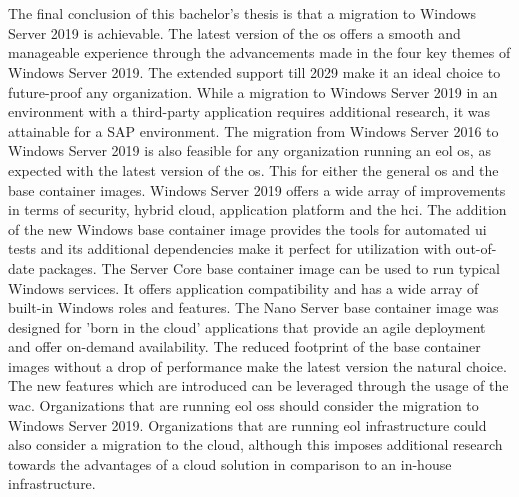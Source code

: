 \chapter{}
\label{ch:conclusie}
The final conclusion of this bachelor's thesis is that a migration to Windows Server 2019 is achievable.
The latest version of the \acrshort{os} offers a smooth and manageable experience through the advancements made in the four key themes of Windows Server 2019. 
The extended support till 2029 make it an ideal choice to future-proof any organization. 
While a migration to Windows Server 2019 in an environment with a third-party application requires additional research, it was attainable for a SAP environment. 
The migration from Windows Server 2016 to Windows Server 2019 is also feasible for any organization running an \acrshort{eol} \acrshort{os}, as expected with the latest version of the \acrshort{os}.
This for either the general \acrshort{os} and the base container images.
Windows Server 2019 offers a wide array of improvements in terms of security, hybrid cloud, application platform and the \acrfull{hci}.
The addition of the new Windows base container image provides the tools for automated \acrshort{ui} tests and its additional dependencies make it perfect for utilization with out-of-date packages. 
The Server Core base container image can be used to run typical Windows services. 
It offers application compatibility and has a wide array of built-in Windows roles and features. 
The Nano Server base container image was designed for 'born in the cloud' applications that provide an agile deployment and offer on-demand availability. 
The reduced footprint of the base container images without a drop of performance make the latest version the natural choice. 
The new features which are introduced can be leveraged through the usage of the \acrfull{wac}.
Organizations that are running \acrshort{eol} \acrlong{os}s should consider the migration to Windows Server 2019.
Organizations that are running \acrshort{eol} infrastructure could also consider a migration to the cloud, although this imposes additional research towards the advantages of a cloud solution in comparison to an in-house infrastructure.
